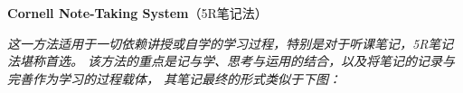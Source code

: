 \newpage

\begin{shaded}
	{\bf\Large Cornell Note-Taking System}\hfill{（5R笔记法）}
	
	\bigskip
	
	{\it 这一方法适用于一切依赖讲授或自学的学习过程，特别是对于听课笔记，5R笔记法堪称首选。
	该方法的重点是记与学、思考与运用的结合，以及将笔记的记录与完善作为学习的过程载体，
	其笔记最终的形式类似于下图：}
	
	\begin{center}
		\quad

\end{center}
\end{shaded}
